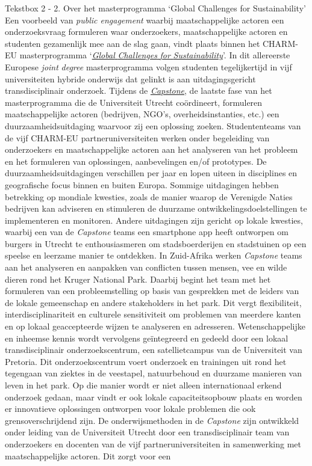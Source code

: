 \documentclass[smallauthor, chapterhaspagenum, nochapterinheader, pagenuminheader,  bigchapnum,medium2, tocpages,  garamond, titleinheader]{jote-book}
\begin{document}
	\begin{bookbox}{Tekstbox 2 - 2. Over het masterprogramma ‘Global Challenges for Sustainability'}
		Een voorbeeld van \emph{public engagement} waarbij maatschappelijke actoren een onderzoeksvraag formuleren waar onderzoekers, maatschappelijke actoren en studenten gezamenlijk mee aan de slag gaan, vindt plaats binnen het CHARM-EU masterprogramma ‘\href{https://www.charm-eu.eu/masters/globalchallenges}{\emph{Global }\emph{Challenges}\emph{ }\emph{for}\emph{ }\emph{Sustainability}}'. In dit allereerste Europese \emph{joint }\emph{degree} masterprogramma volgen studenten tegelijkertijd in vijf universiteiten hybride onderwijs dat gelinkt is aan uitdagingsgericht transdisciplinair onderzoek. Tijdens de \href{https://www.charm-eu.eu/capstonephase}{\emph{Capstone}}, de laatste fase van het masterprogramma die de Universiteit Utrecht coördineert, formuleren maatschappelijke actoren (bedrijven, NGO's, overheidsinstanties, etc.) een duurzaamheidsuitdaging waarvoor zij een oplossing zoeken. Studententeams van de vijf CHARM-EU partneruniversiteiten werken onder begeleiding van onderzoekers en maatschappelijke actoren aan het analyseren van het probleem en het formuleren van oplossingen, aanbevelingen en/of prototypes. De duurzaamheidsuitdagingen verschillen per jaar en lopen uiteen in disciplines en geografische focus binnen en buiten Europa. Sommige uitdagingen hebben betrekking op mondiale kwesties, zoals de manier waarop de Verenigde Naties bedrijven kan adviseren en stimuleren de duurzame ontwikkelingsdoelstellingen te implementeren en monitoren. Andere uitdagingen zijn gericht op lokale kwesties, waarbij een van de \emph{Capstone} teams een smartphone app heeft ontworpen om burgers in Utrecht te enthousiasmeren om stadsboerderijen en stadstuinen op een speelse en leerzame manier te ontdekken. In Zuid-Afrika werken \emph{Capstone} teams aan het analyseren en aanpakken van conflicten tussen mensen, vee en wilde dieren rond het Kruger National Park. Daarbij begint het team met het formuleren van een probleemstelling op basis van gesprekken met de leiders van de lokale gemeenschap en andere stakeholders in het park. Dit vergt flexibiliteit, interdisciplinariteit en culturele sensitiviteit om problemen van meerdere kanten en op lokaal geaccepteerde wijzen te analyseren en adresseren. Wetenschappelijke en inheemse kennis wordt vervolgens geïntegreerd en gedeeld door een lokaal transdisciplinair onderzoekscentrum, een satellietcampus van de Universiteit van Pretoria. Dit onderzoekscentrum voert onderzoek en trainingen uit rond het tegengaan van ziektes in de veestapel, natuurbehoud en duurzame manieren van leven in het park. Op die manier wordt er niet alleen internationaal erkend onderzoek gedaan, maar vindt er ook lokale capaciteitsopbouw plaats en worden er innovatieve oplossingen ontworpen voor lokale problemen die ook grensoverschrijdend zijn. De onderwijsmethoden in de \emph{Capstone} zijn ontwikkeld onder leiding van de Universiteit Utrecht door een transdisciplinair team van onderzoekers en docenten van de vijf partneruniversiteiten in samenwerking met maatschappelijke actoren. Dit zorgt voor een 
\end{bookbox}
\end{document}
